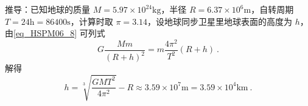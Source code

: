 推导：已知地球的质量 $M=5.97\times10^{24}\mathrm{kg}$，半径 $R=6.37\times10^6\mathrm{m}$，自转周期 $T=24\mathrm{h}=86400\mathrm{s}$，计算时取 $\pi=3.14$，设地球同步卫星里地球表面的高度为 $h$，由\autoref{eq_HSPM06_8} 可列式
\begin{equation}
G\frac{Mm}{(R+h)^2}= m\frac{4\pi^2}{T^2}(R+h)~.
\end{equation}
解得
\begin{equation}
h=\sqrt[3]{\frac{GMT^2}{4\pi^2}}-R \approx 3.59\times10^7\mathrm{m}=3.59\times10^4\mathrm{km}~.
\end{equation}
